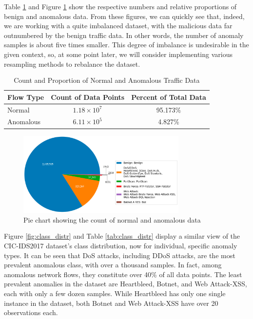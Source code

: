Table \ref{tab:data_percentages} and Figure \ref{fig:data_count} show the respective numbers and relative proportions of benign and anomalous data. From these figures, we can quickly see that, indeed, we are working with a quite imbalanced dataset, with the malicious data far outnumbered by the benign traffic data. In other words, the number of anomaly samples is about five times smaller. This degree of imbalance is undesirable in the given context, so, at some point later, we will consider implementing various resampling methods to rebalance the dataset.

\begin{table}[h] 
\centering 
\caption{Count and Proportion of Normal and Anomalous Traffic Data}
\label{tab:data_percentages} 
\begin{tabular}{lcc} 
\toprule 
Flow Type & Count of Data Points & Percent of Total Data \\
\midrule 
Normal & $1.18\times10^7$ & 95.173\% \\ 
Anomalous & $6.11\times10^5$ & 4.827\% \\ 
\bottomrule 
\end{tabular} 
\end{table} 

\begin{figure}[H] 
\centering 
\includegraphics[width=0.75\textwidth]{assets/figures/data_count.png} 
\caption{Pie chart showing the count of normal and anomalous data}
\label{fig:data_count} 
\end{figure} 
\parencite{s23218788}

Figure \ref{fig:class_distr} and Table \ref{tab:class_distr} display a similar view of the CIC-IDS2017 dataset's class distribution, now for individual, specific anomaly types. It can be seen that DoS attacks, including DDoS attacks, are the most prevalent anomalous class, with over a thousand samples. In fact, among anomalous network flows, they constitute over 40\% of all data points. The least prevalent anomalies in the dataset are Heartbleed, Botnet, and Web Attack-XSS, each with only a few dozen samples. While Heartbleed has only one single instance in the dataset, both Botnet and Web Attack-XSS have over 20 observations each.

